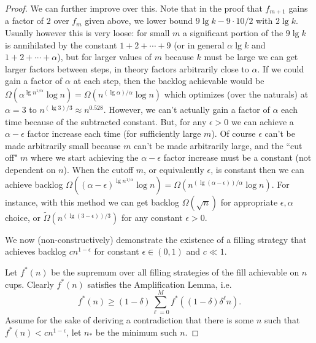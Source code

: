 \documentclass[twocolumn]{article}[11pt]
\renewcommand{\paragraph}[1]{\vspace{0.09in}\noindent{\bf \boldmath #1.}}
\begin{document}
\begin{proof}
  We can further improve over this. Note that in the proof that
  $f_{m+1}$ gains a factor of $2$ over $f_m$ given above, we lower bound
  $9\lg k - 9\cdot 10 /2$ with $2\lg k$. Usually however this is very
  loose: for small $m$ a significant portion of the $9 \lg k$ is annihilated
  by the constant $1+2+\cdots+9$ (or in general $\alpha \lg k$ and
  $1+2+\cdots + \alpha$), but for larger values of $m$ because $k$ must be
  large we can get larger factors between steps, in theory factors arbitrarily
  close to $\alpha$. If we could gain a factor of $\alpha$ at each step, then
  the backlog achievable would be $\Omega(\alpha^{\lg{n^{1/\alpha}}}\log n)=
  \Omega(n^{(\lg{\alpha})/\alpha} \log n)$ which optimizes (over the
  naturals)
  at $\alpha = 3$ to $n^{(\lg 3)/3} \approx n^{0.528}$. However, we can't
  actually gain a factor of $\alpha$ each time because of the subtracted
  constant. But, for any $\epsilon >0$ we can achieve a $\alpha - \epsilon$
  factor increase each time (for sufficiently large $m$). Of course $\epsilon$
  can't be made arbitrarily small because $m$ can't be made arbitrarily large,
  and the ``cut off" $m$ where we start achieving the $\alpha - \epsilon$
  factor increase must be a constant (not dependent on $n$). When the cutoff
  $m$, or equivalently $\epsilon$, is constant then we can achieve backlog
  $\Omega((\alpha - \epsilon)^{\lg{n^{1/\alpha}}}\log n)=
  \Omega(n^{(\lg(\alpha - \epsilon))/\alpha} \log n)$. For instance, with
  this method we can get backlog $\Omega(\sqrt{n})$ for appropriate $\epsilon,
  \alpha$ choice, or $\tilde{\Omega}(n^{(\lg (3 - \epsilon))/3})$ for any
  constant $\epsilon >0$. 

  \paragraph{Existential Improvement}
  We now (non-constructively) demonstrate the existence of a filling strategy
  that achieves backlog $c n^{1-\epsilon}$ for constant $\epsilon \in (0,1)$
  and $c \ll 1$.

  Let $f^*(n)$ be the supremum over all filling strategies of the fill achievable on $n$ cups.
  Clearly $f^*(n)$ satisfies the Amplification Lemma, i.e.
  $$f^*(n) \ge (1-\delta)\sum_{\ell=0}^M f^*((1-\delta)\delta^\ell n).$$
  Assume for the sake of deriving a contradiction that there is some $n$ such
  that $f^*(n) < cn^{1-\epsilon}$, let $n_*$ be the minimum such $n$.


\end{proof}
\end{document}
